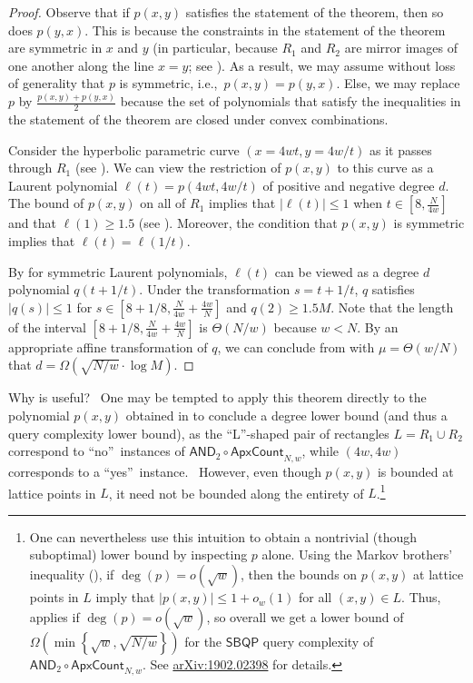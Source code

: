 \documentclass[10pt,a4paper]{article}
\newcommand{\<}{\langle}
\renewcommand{\>}{\rangle}
\begin{document}
\begin{proof}
Observe that if $p(x, y)$ satisfies the statement of the theorem, then so does $p(y, x)$. This is because the constraints in the statement of the theorem are symmetric in $x$ and $y$ (in particular, because $R_1$ and $R_2$ are mirror images of one another along the line $x = y$; see ). As a result, we may assume without loss of generality that $p$ is symmetric, i.e.,\ $p(x, y) = p(y, x)$. Else, we may replace $p$ by $\frac{p(x, y) + p(y, x)}{2}$ because the set of polynomials that satisfy the inequalities in the statement of the theorem are closed under convex combinations.

Consider the hyperbolic parametric curve $(x = 4wt, y=4w/t)$ as it passes through $R_1$ (see ). We can view the restriction of $p(x, y)$ to this curve as a Laurent polynomial $\ell(t) = p(4wt, 4w/t)$ of positive and negative degree $d$. The bound of $p(x,y)$ on all of $R_1$ implies that $|\ell(t)| \le 1$ when $t \in [8, \frac{N}{4w}]$ and that $\ell(1) \ge 1.5$ (see ). Moreover, the condition that $p(x, y)$ is symmetric implies that $\ell(t) = \ell(1/t)$.

By  for symmetric Laurent polynomials, $\ell(t)$ can be viewed as a degree $d$ polynomial $q(t + 1/t)$. Under the transformation $s = t + 1/t$, $q$ satisfies $|q(s)| \le 1$ for $s \in [8 + 1/8, \frac{N}{4w} + \frac{4w}{N}]$ and $q(2) \ge 1.5 M$. Note that the length of the interval $[8 + 1/8, \frac{N}{4w} + \frac{4w}{N}]$ is $\Theta(N/w)$ because $w < N$. By an appropriate affine transformation of $q$, we can conclude from  with $\mu = \Theta(w/N)$ that $d = \Omega(\sqrt{N/w} \cdot \log M)$.
\end{proof}

Why is  useful? \ One may be tempted to apply this theorem
directly to the polynomial $p(x,y)$ obtained in  to
conclude a degree lower bound (and thus a query complexity lower bound), as
the \textquotedblleft L\textquotedblright -shaped pair of rectangles $
L=R_{1}\cup R_{2}$ correspond to \textquotedblleft no\textquotedblright\
instances of $\mathsf{AND}_{2}\circ \mathsf{ApxCount}_{N,w}$, while $(4w,4w)$
corresponds to a \textquotedblleft yes\textquotedblright\ instance. \
However, even though $p(x,y)$ is bounded at lattice points in $L$, it need
not be bounded along the entirety of $L$.\footnote{
One can nevertheless use this intuition to obtain a nontrivial (though
suboptimal) lower bound by inspecting $p$ alone. Using the Markov brothers'
inequality (\Cref{markovlem}), if $\deg (p)=o(\sqrt{w})$, then the bounds on
$p(x,y)$ at lattice points in $L$ imply that $|p(x,y)|\leq 1+o_{w}(1)$ for
all $(x,y)\in L$. Thus, \Cref{thm:L} applies if $\deg (p)=o(\sqrt{w})$, so
overall we get a lower bound of $\Omega \left( \min \left\{ \sqrt{w},\sqrt{
N/w}\right\} \right) $ for the $\mathsf{SBQP}$ query complexity of $\mathsf{
AND}_{2}\circ \mathsf{ApxCount}_{N,w}$. See 
\href{https://arxiv.org/abs/1902.02398}{arXiv:1902.02398} for details.} \ 
\end{document}
